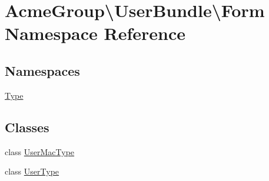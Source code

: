 \hypertarget{namespace_acme_group_1_1_user_bundle_1_1_form}{\section{Acme\+Group\textbackslash{}User\+Bundle\textbackslash{}Form Namespace Reference}
\label{namespace_acme_group_1_1_user_bundle_1_1_form}
}
\subsection*{Namespaces}
\begin{DoxyCompactItemize}
\item 
 \hyperlink{namespace_acme_group_1_1_user_bundle_1_1_form_1_1_type}{Type}
\end{DoxyCompactItemize}
\subsection*{Classes}
\begin{DoxyCompactItemize}
\item 
class \hyperlink{class_acme_group_1_1_user_bundle_1_1_form_1_1_user_mac_type}{User\+Mac\+Type}
\item 
class \hyperlink{class_acme_group_1_1_user_bundle_1_1_form_1_1_user_type}{User\+Type}
\end{DoxyCompactItemize}
